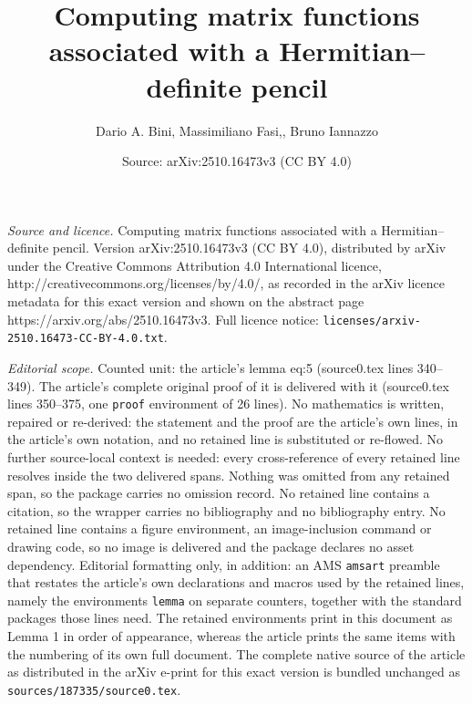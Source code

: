 \documentclass[10pt,a4paper]{amsart}
\title{Computing matrix functions associated with a Hermitian--definite pencil}
\author{Dario A. Bini, Massimiliano Fasi,, Bruno Iannazzo}
\date{Source: arXiv:2510.16473v3 (CC BY 4.0)}
\newtheorem{lemma}{Lemma}
\newcommand{\C}{\ensuremath{\mathbb C}}
\newcommand{\Cnn}{\ensuremath{\C^{n \times n}}}
\newcommand{\Df}[3]{D#1(#2)[#3]}
\newcommand{\deq}{\ensuremath{:=}}
\begin{document}
\maketitle

\noindent\emph{Source and licence.} Computing matrix functions associated with a Hermitian--definite pencil. Version arXiv:2510.16473v3 (CC BY 4.0), distributed by arXiv under the Creative Commons Attribution 4.0 International licence, http://creativecommons.org/licenses/by/4.0/, as recorded in the arXiv licence metadata for this exact version and shown on the abstract page https://arxiv.org/abs/2510.16473v3. Full licence notice: \texttt{licenses/arxiv-2510.16473-CC-BY-4.0.txt}.\par\smallskip

\noindent\textit{Editorial scope.} Counted unit: the article's lemma eq:5 (source0.tex lines 340--349). The article's complete original proof of it is delivered with it (source0.tex lines 350--375, one \texttt{proof} environment of 26 lines). No mathematics is written, repaired or re-derived: the statement and the proof are the article's own lines, in the article's own notation, and no retained line is substituted or re-flowed.  No further source-local context is needed: every cross-reference of every retained line resolves inside the two delivered spans.  Nothing was omitted from any retained span, so the package carries no omission record.  No retained line contains a citation, so the wrapper carries no bibliography and no bibliography entry.  No retained line contains a figure environment, an image-inclusion command or drawing code, so no image is delivered and the package declares no asset dependency.  Editorial formatting only, in addition: an AMS \texttt{amsart} preamble that restates the article's own declarations and macros used by the retained lines, namely the environments \texttt{lemma} on separate counters, together with the standard packages those lines need.  The retained environments print in this document as Lemma 1 in order of appearance, whereas the article prints the same items with the numbering of its own full document.  The complete native source of the article as distributed in the arXiv e-print for this exact version is bundled unchanged as \texttt{sources/187335/source0.tex}.
\end{document}

